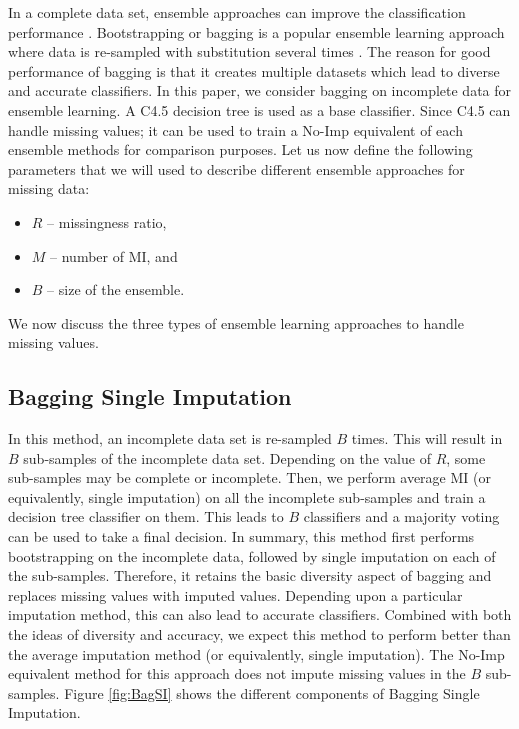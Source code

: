 \documentclass{iosart2c}
\begin{document}
In a complete data set, ensemble approaches can improve the classification performance \cite{Kuncheva}. Bootstrapping or bagging is a popular ensemble learning approach where data is re-sampled with substitution several times \cite{Brieman, dahiya2017feature}. The reason for good performance of bagging is that it creates multiple datasets which lead to diverse and accurate classifiers.
In this paper, we consider bagging on incomplete data for ensemble learning. A C4.5 decision tree is used as a base classifier. Since C4.5 can handle missing values; it can be used to train a No-Imp equivalent of each ensemble methods for comparison purposes. Let us now define the following parameters that we will used to describe different ensemble approaches for missing data:
\begin{itemize}[label=\textbullet]
 \item $R$ -- missingness ratio,
  \item $M$ -- number of MI, and
  \item $B$ -- size of the ensemble.
\end{itemize}

We now discuss the three types of ensemble learning approaches to handle missing values.

\subsection{Bagging Single Imputation}

In this method, an incomplete data set is re-sampled $B$ times. This will result in $B$ sub-samples of the incomplete data set. Depending on the value of $R$, some sub-samples may be complete or incomplete. Then, we perform average MI (or equivalently, single imputation) on all the incomplete sub-samples and train a decision tree classifier on them. This leads to $B$ classifiers and a majority voting can be used to take a final decision. 
In summary, this method first performs bootstrapping on the incomplete data, followed by single imputation on each of the sub-samples.
Therefore, it retains the basic diversity aspect of bagging and replaces missing values with imputed values. Depending upon a particular imputation method, this can also lead to accurate classifiers. Combined with both the ideas of diversity and accuracy, we expect this method to perform better than the average imputation method (or equivalently, single imputation). The No-Imp equivalent method for this approach does not impute missing values in the $B$ sub-samples. Figure \ref{fig:BagSI} shows the different components of Bagging Single Imputation.
\end{document}
